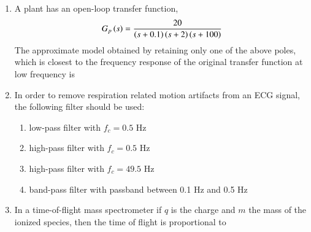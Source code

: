 \documentclass[journal,12pt,onecolumn]{IEEEtran}
\theoremstyle{remark}
\begin{document}
\begin{enumerate}
    \item A plant has an open-loop transfer function, 
    \begin{align*}
    G_p\left(s\right) = \frac{20}{\left(s+0.1\right)\left(s+2\right)\left(s+100\right)}
    \end{align*}
    The approximate model obtained by retaining only one of the above poles, which is closest to the frequency response of the original transfer function at low frequency is

    \hfill{}
        \begin{enumerate}
        \end{enumerate}

    \item In order to remove respiration related motion artifacts from an ECG signal, the following filter should be used:

    \hfill{}
    \begin{enumerate}
        \item low-pass filter with $f_c = 0.5$ Hz
        \item high-pass filter with $f_c = 0.5$ Hz
        \item high-pass filter with $f_c = 49.5$ Hz
        \item band-pass filter with passband between 0.1 Hz and 0.5 Hz
    \end{enumerate}
    
    \item In a time-of-flight mass spectrometer if $q$ is the charge and $m$ the mass of the ionized species, then the time of flight is proportional to

    \hfill{}
        \begin{enumerate}
        \end{enumerate}

\end{enumerate}
\end{document}
